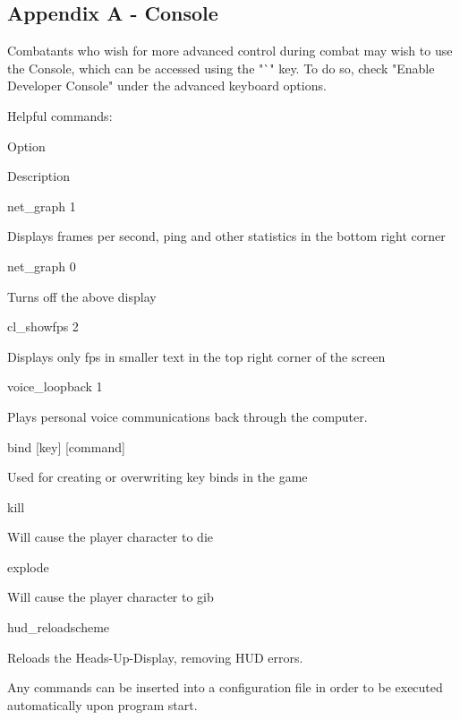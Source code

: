 \subsection{Appendix A - Console}
Combatants who wish for more advanced control during combat may wish to use the Console, which can be accessed using the "`" key. To do so, check "Enable Developer Console" under the advanced keyboard options.

Helpful commands:
       
Option
        
Description
            
net\_graph 1
        
Displays frames per second, ping and other statistics in the bottom right corner
            
net\_graph 0
        
Turns off the above display
            
cl\_showfps 2
        
Displays only fps in smaller text in the top right corner of the screen
            
voice\_loopback 1
        
Plays personal voice communications back through the computer.
            
bind [key] [command]
        
Used for creating or overwriting key binds in the game
            
kill
        
Will cause the player character to die
            
explode
        
Will cause the player character to gib

hud\_reloadscheme

Reloads the Heads-Up-Display, removing HUD errors.
 
Any commands can be inserted into a configuration file in order to be executed automatically upon program start.